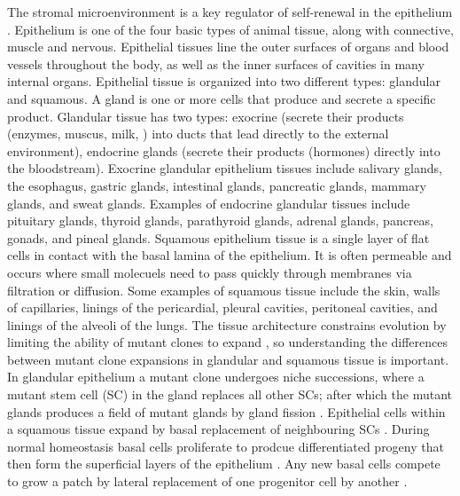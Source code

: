 \documentclass[\main/thesis.tex]{subfiles}
\begin{document}
The stromal microenvironment is a key regulator of self-renewal in the 
epithelium \parencite{Davis}. Epithelium is one of the four basic types of 
animal tissue, along with connective, muscle and nervous. Epithelial tissues 
line the outer surfaces of organs and blood vessels throughout the body, as well 
as the inner surfaces of cavities in many internal organs. Epithelial tissue is 
organized into two different types: glandular and squamous. A gland is one or 
more cells that produce and secrete a specific product. Glandular tissue has two 
types: exocrine (secrete their products (enzymes, muscus, milk, \etc) into ducts 
that lead directly to the external environment), endocrine glands (secrete their 
products (hormones) directly into the bloodstream). Exocrine glandular 
epithelium tissues include salivary glands, the esophagus, gastric glands, 
intestinal glands, pancreatic glands, mammary glands, and sweat glands. Examples 
of endocrine glandular tissues include pituitary glands, thyroid glands, 
parathyroid glands, adrenal glands, pancreas, gonads, and pineal glands. 
Squamous epithelium tissue is a single layer of flat cells in contact with the 
basal lamina of the epithelium. It is often permeable and occurs where small 
molecuels need to pass quickly through membranes via filtration or diffusion. 
Some examples of squamous tissue include the skin, walls of capillaries, linings 
of the pericardial, pleural cavities, peritoneal cavities, and linings of the 
alveoli of the lungs. The tissue architecture constrains evolution by limiting 
the ability of mutant clones to expand \parencite{Martens}, so understanding the 
differences between mutant clone expansions in glandular and squamous tissue is 
important. In glandular epithelium a mutant clone undergoes niche successions, 
where a mutant stem cell (SC) in the gland replaces all other SCs; after which 
the mutant glands produces a field of mutant glands by gland fission 
\parencite{Baker,LGreaves,McDonald,Nicholson}. Epithelial cells within a 
squamous tissue expand by basal replacement of neighbouring SCs 
\parencite{Klein,Alcolea,Clayton,Doupe}. During normal homeostasis basal cells 
proliferate to prodcue differentiated progeny that then form the superficial 
layers of the epithelium \parencite{Teixeira}. Any new basal cells compete to 
grow a patch by lateral replacement of one progenitor cell by another 
\parencite{Teixeira}. 
\end{document}
